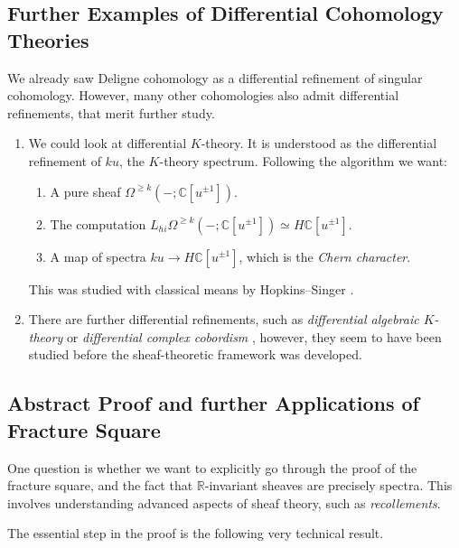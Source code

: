 \documentclass[a4paper]{book}
\newcommand{\bC}{\mathbb{C}}
\newcommand{\bR}{\mathbb{R}}
\theoremstyle{definition}
\theoremstyle{remark}
\numberwithin{equation}{section}
\begin{document}
\subsection{Further Examples of Differential Cohomology Theories}
We already saw Deligne cohomology as a differential refinement of singular cohomology. However, many other cohomologies also admit differential refinements, that merit further study.
\begin{enumerate}
  \item We could look at differential $K$-theory. It is understood as the differential refinement of $ku$, the $K$-theory spectrum. Following the algorithm we want:
  \begin{enumerate}
   \item A pure sheaf $\Omega^{\geq k}(- ;\mathbb{C}[u^{\pm 1}])$.
   \item The computation $L_{hi}\Omega^{\geq k}(- ;\mathbb{C}[u^{\pm 1}]) \simeq H\bC[u^{\pm 1}]$.
   \item A map of spectra $ku \to H\bC[u^{\pm 1}]$, which is the \emph{Chern character}.
  \end{enumerate}
  This was studied with classical means by Hopkins--Singer \cite{hopkinssinger2005diffcoh}.
  \item There are further differential refinements, such as \emph{differential algebraic $K$-theory} \cite{bunkegepner2021diffktheory} or \emph{differential complex cobordism} \cite{bunkeschickschroederwiethaup2009landweber}, however, they seem to have been studied before the sheaf-theoretic framework was developed.
\end{enumerate}

\subsection{Abstract Proof and further Applications of Fracture Square}
One question is whether we want to explicitly go through the proof of the fracture square, and the fact that $\bR$-invariant sheaves are precisely spectra. This involves understanding advanced aspects of sheaf theory, such as \emph{recollements}.

The essential step in the proof is the following very technical result.
\end{document}
